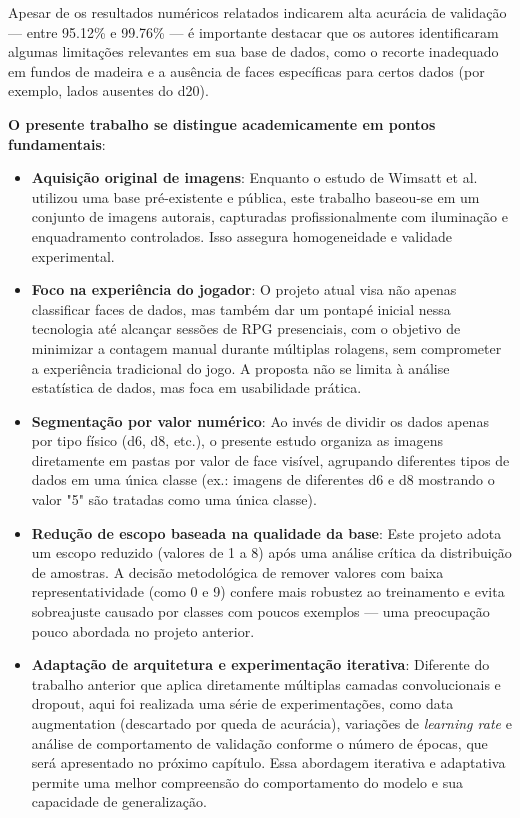 Apesar de os resultados numéricos relatados indicarem alta acurácia de validação — entre 95.12\% e 99.76\% — é importante destacar 
que os autores identificaram algumas limitações relevantes em sua base de dados, como o recorte inadequado em fundos de madeira e a 
ausência de faces específicas para certos dados (por exemplo, lados ausentes do d20).

\textbf{O presente trabalho se distingue academicamente em pontos fundamentais}:

\begin{itemize}
    \item \textbf{Aquisição original de imagens}: Enquanto o estudo de Wimsatt et al. utilizou uma base pré-existente e pública, 
    este trabalho baseou-se em um conjunto de imagens autorais, capturadas profissionalmente com iluminação e enquadramento controlados. 
    Isso assegura homogeneidade e validade experimental.
    
    \item \textbf{Foco na experiência do jogador}: O projeto atual visa não apenas classificar faces de dados, mas também dar um pontapé inicial
    nessa tecnologia até alcançar sessões de RPG presenciais, com o objetivo de minimizar a contagem manual durante múltiplas rolagens, sem 
    comprometer a experiência tradicional do jogo. A proposta não se limita à análise estatística de dados, mas foca em usabilidade prática.
    
    \item \textbf{Segmentação por valor numérico}: Ao invés de dividir os dados apenas por tipo físico (d6, d8, etc.), o presente 
    estudo organiza as imagens diretamente em pastas por valor de face visível, agrupando diferentes tipos de dados em uma única 
    classe (ex.: imagens de diferentes d6 e d8 mostrando o valor "5" são tratadas como uma única classe).
    
    \item \textbf{Redução de escopo baseada na qualidade da base}: Este projeto adota um escopo reduzido (valores de 1 a 8) após
    uma análise crítica da distribuição de amostras. A decisão metodológica de remover valores com baixa representatividade (como 0 e 9) 
    confere mais robustez ao treinamento e evita sobreajuste causado por classes com poucos exemplos — uma preocupação pouco abordada no 
    projeto anterior.
    
    \item \textbf{Adaptação de arquitetura e experimentação iterativa}: Diferente do trabalho anterior que aplica diretamente múltiplas 
    camadas convolucionais e dropout, aqui foi realizada uma série de experimentações, como data augmentation (descartado por queda de 
    acurácia), variações de \textit{learning rate} e análise de comportamento de validação conforme o número de épocas, que será apresentado
    no próximo capítulo. Essa abordagem iterativa e adaptativa permite uma melhor compreensão do comportamento do modelo e sua capacidade
    de generalização.
\end{itemize}

